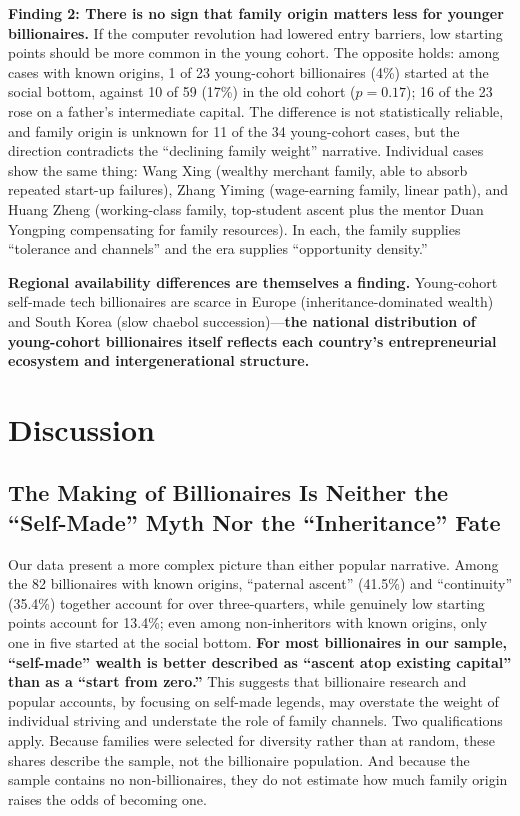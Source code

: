 \documentclass[11pt,a4paper]{article}
\begin{document}
\textbf{Finding 2: There is no sign that family origin matters less for younger billionaires.} If the computer revolution had lowered entry barriers, low starting points should be more common in the young cohort. The opposite holds: among cases with known origins, 1 of 23 young-cohort billionaires (4\%) started at the social bottom, against 10 of 59 (17\%) in the old cohort ($p=0.17$); 16 of the 23 rose on a father's intermediate capital. The difference is not statistically reliable, and family origin is unknown for 11 of the 34 young-cohort cases, but the direction contradicts the ``declining family weight'' narrative. Individual cases show the same thing: Wang Xing (wealthy merchant family, able to absorb repeated start-up failures), Zhang Yiming (wage-earning family, linear path), and Huang Zheng (working-class family, top-student ascent plus the mentor Duan Yongping compensating for family resources). In each, the family supplies ``tolerance and channels'' and the era supplies ``opportunity density.''

\textbf{Regional availability differences are themselves a finding.} Young-cohort self-made tech billionaires are scarce in Europe (inheritance-dominated wealth) and South Korea (slow chaebol succession)---\textbf{the national distribution of young-cohort billionaires itself reflects each country's entrepreneurial ecosystem and intergenerational structure.}

\section{Discussion}
\label{sec:discussion}

\subsection{The Making of Billionaires Is Neither the ``Self-Made'' Myth Nor the ``Inheritance'' Fate}

Our data present a more complex picture than either popular narrative. Among the 82 billionaires with known origins, ``paternal ascent'' (41.5\%) and ``continuity'' (35.4\%) together account for over three-quarters, while genuinely low starting points account for 13.4\%; even among non-inheritors with known origins, only one in five started at the social bottom.
\textbf{For most billionaires in our sample, ``self-made'' wealth is better described as ``ascent atop existing capital'' than as a ``start from zero.''} This suggests that billionaire research and popular accounts, by focusing on self-made legends, may overstate the weight of individual striving and understate the role of family channels. Two qualifications apply. Because families were selected for diversity rather than at random, these shares describe the sample, not the billionaire population. And because the sample contains no non-billionaires, they do not estimate how much family origin raises the odds of becoming one.
\end{document}
